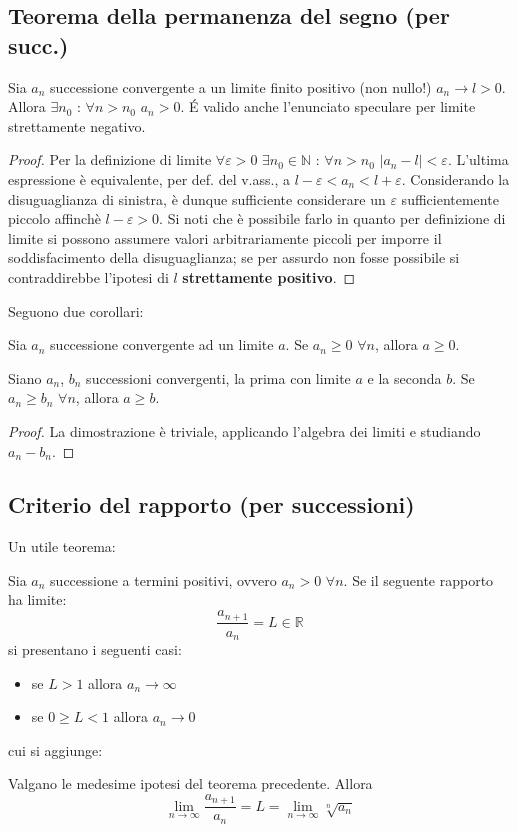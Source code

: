 \documentclass[10pt]{article}
\theoremstyle{plain}
\begin{document}
\subsection{Teorema della permanenza del segno (per succ.)}
\begin{ther}
    Sia $a_n$ successione convergente a un limite finito positivo (non nullo!) $a_n \rightarrow l > 0$. Allora $\exists n_0$ : $\forall n > n_0$ $a_n > 0$. \'E valido anche l'enunciato speculare per limite strettamente negativo.
\end{ther}
\begin{proof}
    Per la definizione di limite $\forall \varepsilon > 0$ $\exists n_0 \in \mathbb{N}$ : $\forall n > n_0$ $|a_n - l| < \varepsilon$. L'ultima espressione è equivalente, per def. del v.ass., a $l - \varepsilon < a_n < l + \varepsilon$. Considerando la disuguaglianza di sinistra, è dunque sufficiente considerare un $\varepsilon$ sufficientemente piccolo affinchè $l - \varepsilon > 0$. Si noti che è possibile farlo in quanto per definizione di limite si possono assumere valori arbitrariamente piccoli per imporre il soddisfacimento della disuguaglianza; se per assurdo non fosse possibile si contraddirebbe l'ipotesi di $l$ \textbf{strettamente positivo}.
\end{proof}
Seguono due corollari:
\begin{cor}
    Sia $a_n$ successione convergente ad un limite $a$. Se $a_n \geq 0$ $\forall n$, allora $a \geq 0$.
\end{cor}
\begin{cor}
    Siano $a_n$, $b_n$ successioni convergenti, la prima con limite $a$ e la seconda $b$. Se $a_n \geq b_n$ $\forall n$, allora $a \geq b$.
\end{cor}
\begin{proof}
    La dimostrazione è triviale, applicando l'algebra dei limiti e studiando $a_n - b_n$.
\end{proof}

\subsection{Criterio del rapporto (per successioni)}
Un utile teorema:
\begin{ther}
    Sia $a_n$ successione a termini positivi, ovvero $a_n > 0$ $\forall n$. Se il seguente rapporto ha limite:
    \[\frac{a_{n+1}}{a_n} = L \in \mathbb{R}\]
    si presentano i seguenti casi:
    \begin{itemize}
        \item se $L > 1$ allora $a_n \rightarrow \infty$
        \item se $0 \geq L < 1$ allora $a_n \rightarrow 0$
    \end{itemize}
\end{ther}
cui si aggiunge:
\begin{ther}
    Valgano le medesime ipotesi del teorema precedente. Allora
    \[\lim \limits_{n \rightarrow \infty}\frac{a_{n+1}}{a_n} = L = \lim \limits_{n \rightarrow \infty} \sqrt[n]{a_n}\]
\end{ther}
\end{document}
